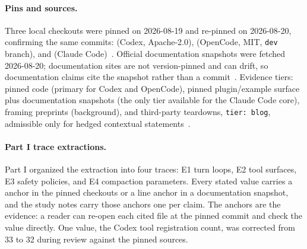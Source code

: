 \documentclass{article}
\newcommand{\codex}[0]{Codex}
\newcommand{\occ}[0]{OpenCode}
\newcommand{\ccc}[0]{Claude Code}
\begin{document}
\paragraph{Pins and sources.} Three local checkouts were pinned on
2026-08-19 and re-pinned on 2026-08-20, confirming the same commits:
 (\codex{},
Apache-2.0),  (\occ{}, MIT,
\texttt{dev} branch), and 
(\ccc{})~\citep{codexRepo,opencodeRepo,claudeCodePluginSurface}. Official
documentation snapshots were fetched 2026-08-20; documentation sites are
not version-pinned and can drift, so documentation claims cite the snapshot
rather than a commit~\citep{claudeCodeDocsHooks,claudeCodeDocsSubagents,%
claudeCodeDocsPlugins,claudeCodeDocsMcp,claudeCodeDocsMemory,%
claudeCodeDocsPermissions,claudeCodeDocsSandboxing,codexDocsSandboxing,%
opencodeDocs,codexDocsRepo,claudeCodeModelDocs,claudeCodeBedrockDocs}.
Evidence tiers: pinned code (primary for \codex{} and \occ{}), pinned
plugin/example surface plus documentation snapshots (the only tier
available for the \ccc{} core), framing preprints (background), and
third-party teardowns, \texttt{tier: blog}, admissible only for hedged
contextual statements~\citep{minusXClaudeCodeTeardown,agiflowClaudeCodeInternals,%
tenguDecoded,claudeCodeRouterContext}.

\paragraph{Part I trace extractions.} Part I organized the extraction into
four traces: E1 turn loops, E2 tool surfaces, E3 safety policies, and E4
compaction parameters. Every stated value carries a  anchor
in the pinned checkouts or a line anchor in a documentation snapshot, and
the study notes carry those anchors one per claim. The anchors are the
evidence: a reader can re-open each cited file at the pinned commit and
check the value directly. One value, the \codex{} tool registration count,
was corrected from 33 to 32 during review against the pinned sources.
\end{document}
